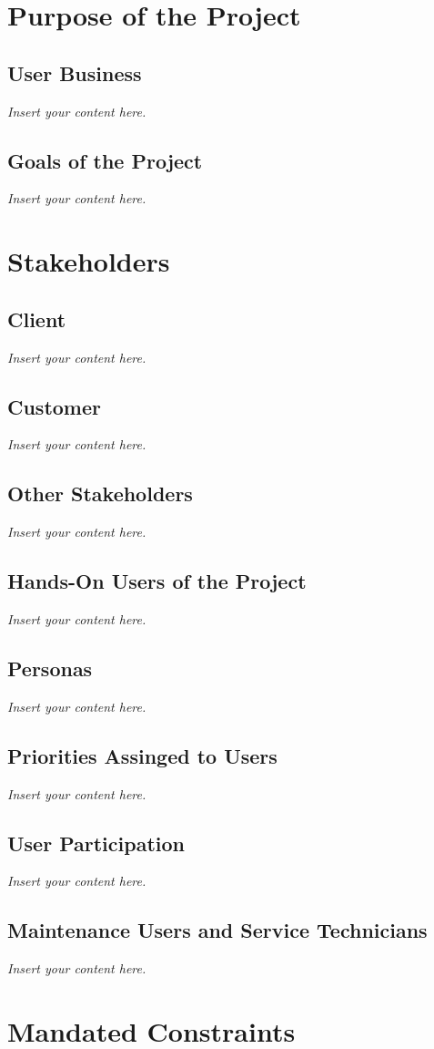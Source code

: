 \documentclass[a4paper, 12pt,twoside]{article}
\newcommand{\lips}{\textit{Insert your content here.}}
\begin{document}
	
\newpage

\section{Purpose of the Project}
\subsection{User Business}
\lips
\subsection{Goals of the Project}
\lips
\section{Stakeholders}
\subsection{Client}
\lips
\subsection{Customer}
\lips
\subsection{Other Stakeholders}
\lips
\subsection{Hands-On Users of the Project}
\lips
\subsection{Personas}
\lips
\subsection{Priorities Assinged to Users}
\lips
\subsection{User Participation}
\lips
\subsection{Maintenance Users and Service Technicians}
\lips

\section{Mandated Constraints}
\end{document}
